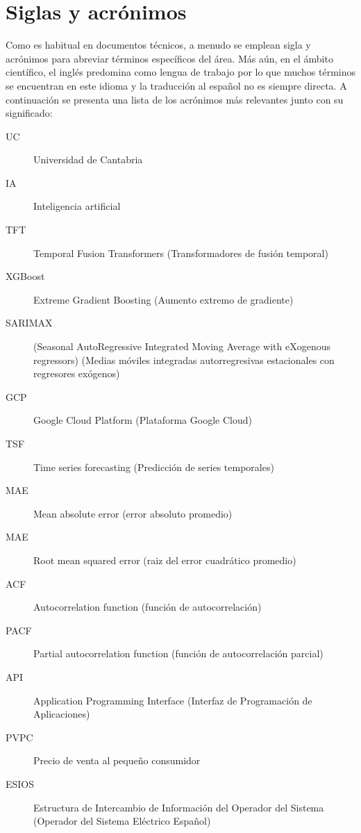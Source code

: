 \clearpage
\hypersetup{linkcolor=black}
\tableofcontents\clearpage
\listoffigures\clearpage
\hypersetup{linkcolor=linkscolor}

\chapter*{Siglas y acrónimos}
%
%
Como es habitual en documentos técnicos, a menudo se emplean sigla y acrónimos para abreviar términos específicos del área. Más aún, en el ámbito científico, el inglés predomina como lengua de trabajo por lo que muchos términos se encuentran en este idioma y la traducción al español no es siempre directa. A continuación se presenta una lista de los acrónimos más relevantes junto con su significado:
%
%
\begin{description}
    \item[UC] Universidad de Cantabria
    \item[IA] Inteligencia artificial
    \item[TFT]  Temporal Fusion Transformers (Transformadores de fusión temporal)
    \item[XGBoost] Extreme Gradient Boosting (Aumento extremo de gradiente)
    \item[SARIMAX] (Seasonal AutoRegressive Integrated Moving Average with eXogenous regressors) (Medias móviles integradas autorregresivas estacionales con regresores exógenos)
    \item[GCP] Google Cloud Platform (Plataforma Google Cloud)
    \item[TSF] Time series forecasting (Predicción de series temporales)
    \item[MAE] Mean absolute error (error absoluto promedio)
    \item[MAE] Root mean squared error (raiz del error cuadrático promedio)
    \item[ACF] Autocorrelation function (función de autocorrelación)
    \item[PACF] Partial autocorrelation function (función de autocorrelación parcial)
    \item[API] Application Programming Interface (Interfaz de Programación de Aplicaciones)
    \item[PVPC] Precio de venta al pequeño consumidor 
    \item[ESIOS] Estructura de Intercambio de Información del Operador del Sistema (Operador del Sistema Eléctrico Español)  
\end{description}

